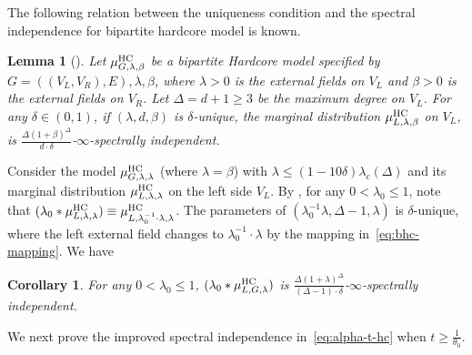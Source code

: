 \documentclass[11pt,a4paper]{article}
\newtheorem{lemma}[theorem]{Lemma}
\newtheorem{corollary}[theorem]{Corollary}
\theoremstyle{definition}
\begin{document}
The following relation between the uniqueness condition and the spectral independence for bipartite hardcore model is known.

\begin{lemma}[]\label{lem:bhc-unique-si}
Let $\mu_{G,\lambda,\beta}^{\textnormal{HC}}$ be a bipartite Hardcore model specified by $G=((V_L,V_R),E),\lambda,\beta$, where $\lambda>0$ is the external fields on $V_L$ and $\beta>0$ is the external fields on $V_R$. Let $\Delta = d+1\geq 3$ be the maximum degree on $V_L$. For any $\delta\in (0,1)$, if $(\lambda,d,\beta)$ is $\delta$-unique, the marginal distribution $\mu^\textnormal{HC}_{L,\lambda,\beta}$ on $V_L$, is $\frac{\Delta(1+\beta)^\Delta}{d \cdot \delta}$-$\infty$-spectrally independent.
\end{lemma}

Consider the model $\mu_{G,\lambda,\lambda}^{\textnormal{HC}}$ (where $\lambda=\beta$) with $\lambda\leq (1-10\delta)\lambda_c(\Delta)$ and its marginal distribution $\mu_{L,\lambda,\lambda}^{\textnormal{HC}}$ on the left side $V_L$. By , for any $0 < \lambda_0 \leq 1$, note that $(\lambda_0 * \mu_{L,\lambda,\lambda}^{\textnormal{HC}})\equiv \mu_{L,\lambda_0^{-1}\cdot\lambda,\lambda}^{\textnormal{HC}}$. The parameters of $(\lambda_0^{-1}\lambda, \Delta - 1, \lambda)$ is $\delta$-unique, where the left external field changes to $\lambda_0^{-1}\cdot\lambda$ by the mapping in~\eqref{eq:bhc-mapping}. We have 
\begin{corollary}\label{cor:bhc-unique-si}
    For any $0 < \lambda_0 \leq 1$, $(\lambda_0 * \mu_{L,G,\lambda}^{\textnormal{HC}})$ is   $\frac{\Delta(1+\lambda)^\Delta}{(\Delta - 1) \cdot \delta}$-$\infty$-spectrally independent.
\end{corollary}


We next prove the improved spectral independence in~\eqref{eq:alpha-t-hc} when $t \geq \frac{1}{\theta_0}$.

\end{document}
